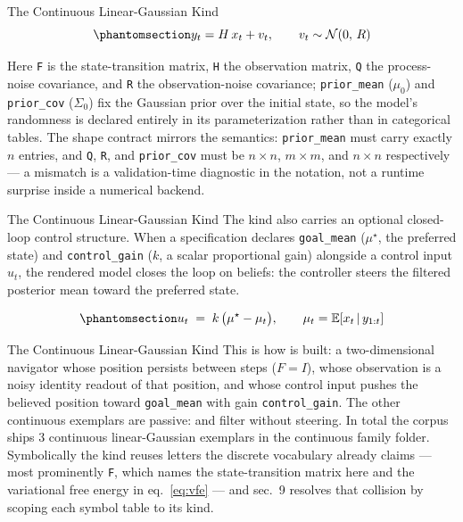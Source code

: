 \documentclass[
  ignorenonframetext,
]{beamer}
\begin{document}
\begin{frame}{The Continuous Linear-Gaussian
Kind}
\begin{equation}\protect\phantomsection\label{eq:lgssm_obs}{
y_t = H\, x_t + v_t, \qquad v_t \sim \mathcal{N}(0,\, R)
}\end{equation}

Here \texttt{F} is the state-transition matrix, \texttt{H} the
observation matrix, \texttt{Q} the process-noise covariance, and
\texttt{R} the observation-noise covariance; \texttt{prior\_mean}
(\(\mu_0\)) and \texttt{prior\_cov} (\(\Sigma_0\)) fix the Gaussian
prior over the initial state, so the model's randomness is declared
entirely in its parameterization rather than in categorical tables. The
shape contract mirrors the semantics: \texttt{prior\_mean} must carry
exactly \(n\) entries, and \texttt{Q}, \texttt{R}, and
\texttt{prior\_cov} must be \(n \times n\), \(m \times m\), and
\(n \times n\) respectively --- a mismatch is a validation-time
diagnostic in the notation, not a runtime surprise inside a numerical
backend.

\end{frame}

\begin{frame}{The Continuous Linear-Gaussian
Kind}
The kind also carries an optional closed-loop control structure. When a
specification declares \texttt{goal\_mean} (\(\mu^\star\), the preferred
state) and \texttt{control\_gain} (\(k\), a scalar proportional gain)
alongside a control input \(u_t\), the rendered model closes the loop on
beliefs: the controller steers the filtered posterior mean toward the
preferred state.

\begin{equation}\protect\phantomsection\label{eq:closed_loop}{
u_t \;=\; k \,\bigl(\mu^\star - \mu_t\bigr), \qquad \mu_t = \mathbb{E}\!\left[x_t \,\middle|\, y_{1:t}\right]
}\end{equation}

\end{frame}

\begin{frame}{The Continuous Linear-Gaussian
Kind}
This is how
 is built:
a two-dimensional navigator whose position persists between steps
(\(F = I\)), whose observation is a noisy identity readout of that
position, and whose control input pushes the believed position toward
\texttt{goal\_mean} with gain \texttt{control\_gain}. The other
continuous exemplars are passive: 
and  filter without steering. In total
the corpus ships 3 continuous linear-Gaussian exemplars in the
continuous family folder. Symbolically the kind reuses letters the
discrete vocabulary already claims --- most prominently \texttt{F},
which names the state-transition matrix here and the variational free
energy in eq.~\ref{eq:vfe} --- and sec.~9
resolves that collision by scoping each symbol table to its kind.
\end{frame}
\end{document}
